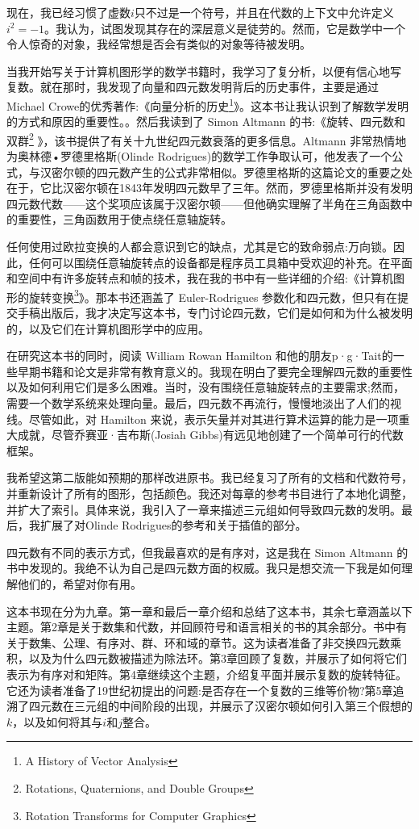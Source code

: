 现在，我已经习惯了虚数$i$只不过是一个符号，并且在代数的上下文中允许定义$i^{2}=-1$。我认为，试图发现其存在的深层意义是徒劳的。然而，它是数学中一个令人惊奇的对象，我经常想是否会有类似的对象等待被发明。

当我开始写关于计算机图形学的数学书籍时，我学习了复分析，以便有信心地写
复数。就在那时，我发现了向量和四元数发明背后的历史事件，主要是通过 Michael Crowe的优秀著作:《向量分析的历史\footnote{ A History of Vector Analysis}》。这本书让我认识到了解数学发明的方式和原因的重要性。。然后我读到了 Simon Altmann 的书:《旋转、四元数和双群\footnote{Rotations, Quaternions, and Double Groups} 》，该书提供了有关十九世纪四元数衰落的更多信息。Altmann 非常热情地为奥林德•罗德里格斯(Olinde Rodrigues)的数学工作争取认可，他发表了一个公式，与汉密尔顿的四元数产生的公式非常相似。罗德里格斯的这篇论文的重要之处在于，它比汉密尔顿在1843年发明四元数早了三年。然而，罗德里格斯并没有发明四元数代数——这个奖项应该属于汉密尔顿——但他确实理解了半角在三角函数中的重要性，三角函数用于使点绕任意轴旋转。

任何使用过欧拉变换的人都会意识到它的缺点，尤其是它的致命弱点:万向锁。因此，任何可以围绕任意轴旋转点的设备都是程序员工具箱中受欢迎的补充。在平面和空间中有许多旋转点和帧的技术，我在我的书中有一些详细的介绍:《计算机图形的旋转变换\footnote{Rotation Transforms for Computer Graphics}》。那本书还涵盖了 Euler-Rodrigues 参数化和四元数，但只有在提交手稿出版后，我才决定写这本书，专门讨论四元数，它们是如何和为什么被发明的，以及它们在计算机图形学中的应用。

在研究这本书的同时，阅读 William Rowan Hamilton 和他的朋友p·g·Tait的一些早期书籍和论文是非常有教育意义的。我现在明白了要完全理解四元数的重要性以及如何利用它们是多么困难。当时，没有围绕任意轴旋转点的主要需求;然而，需要一个数学系统来处理向量。最后，四元数不再流行，慢慢地淡出了人们的视线。尽管如此，对 Hamilton 来说，表示矢量并对其进行算术运算的能力是一项重大成就，尽管乔赛亚·吉布斯(Josiah Gibbs)有远见地创建了一个简单可行的代数框架。

我希望这第二版能如预期的那样改进原书。我已经复习了所有的文档和代数符号，并重新设计了所有的图形，包括颜色。我还对每章的参考书目进行了本地化调整，并扩大了索引。具体来说，我引入了一章来描述三元组如何导致四元数的发明。最后，我扩展了对Olinde Rodrigues的参考和关于插值的部分。

四元数有不同的表示方式，但我最喜欢的是有序对，这是我在 Simon Altmann 的书中发现的。我绝不认为自己是四元数方面的权威。我只是想交流一下我是如何理解他们的，希望对你有用。

这本书现在分为九章。第一章和最后一章介绍和总结了这本书，其余七章涵盖以下主题。第2章是关于数集和代数，并回顾符号和语言相关的书的其余部分。书中有关于数集、公理、有序对、群、环和域的章节。这为读者准备了非交换四元数乘积，以及为什么四元数被描述为除法环。第3章回顾了复数，并展示了如何将它们表示为有序对和矩阵。第4章继续这个主题，介绍复平面并展示复数的旋转特征。它还为读者准备了19世纪初提出的问题:是否存在一个复数的三维等价物?第5章追溯了四元数在三元组的中间阶段的出现，并展示了汉密尔顿如何引入第三个假想的$k$，以及如何将其与$i$和$j$整合。

